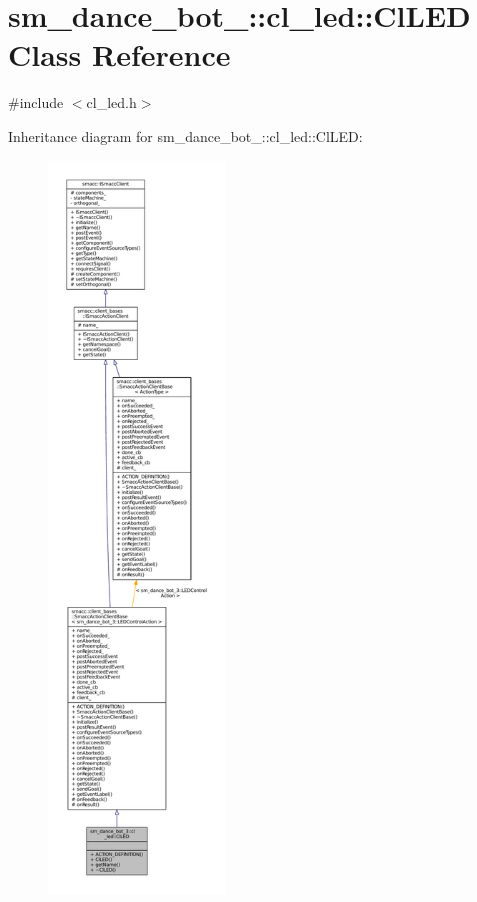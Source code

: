 \hypertarget{classsm__dance__bot__3_1_1cl__led_1_1ClLED}{}\section{sm\+\_\+dance\+\_\+bot\+\_\+:\+:cl\+\_\+led\+:\+:Cl\+L\+ED Class Reference}
\label{classsm__dance__bot__3_1_1cl__led_1_1ClLED}


{\ttfamily \#include $<$cl\+\_\+led.\+h$>$}



Inheritance diagram for sm\+\_\+dance\+\_\+bot\+\_\+:\+:cl\+\_\+led\+:\+:Cl\+L\+ED\+:
\nopagebreak
\begin{figure}[H]
\begin{center}
\leavevmode
\includegraphics[height=550pt]{classsm__dance__bot__3_1_1cl__led_1_1ClLED__inherit__graph}
\end{center}
\end{figure}


